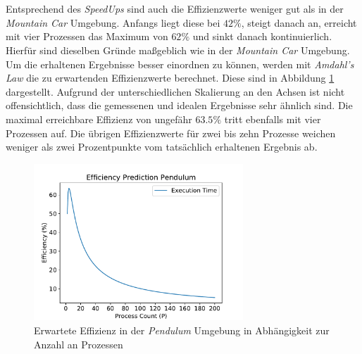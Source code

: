\\\\
Entsprechend des \emph{SpeedUps} sind auch die Effizienzwerte weniger gut als in der \emph{Mountain Car} Umgebung. Anfangs liegt diese bei $42\%$, steigt danach an, erreicht mit vier Prozessen das Maximum von $62\%$ und sinkt danach kontinuierlich. Hierfür sind dieselben Gründe maßgeblich wie in der \emph{Mountain Car} Umgebung. Um die erhaltenen Ergebnisse besser einordnen zu können, werden mit \emph{Amdahl's Law} die zu erwartenden Effizienzwerte berechnet. Diese sind in Abbildung \ref{fig:pendulumr_efficiency_predidction} dargestellt. Aufgrund der unterschiedlichen Skalierung an den Achsen ist nicht offensichtlich, dass die gemessenen und idealen Ergebnisse sehr ähnlich sind. Die maximal erreichbare Effizienz von ungefähr $63.5\%$ tritt ebenfalls mit vier Prozessen auf. Die übrigen Effizienzwerte für zwei bis zehn Prozesse weichen weniger als zwei Prozentpunkte vom tatsächlich erhaltenen Ergebnis ab. 
\begin{figure}[!h]
	\centering
	\includegraphics[width=0.7\textwidth]{./img/pendulum_analysis/pendulum_efficiency_prediction.pdf} 
	\caption{Erwartete Effizienz in der \emph{Pendulum} Umgebung in Abhängigkeit zur Anzahl an Prozessen}
	\label{fig:pendulumr_efficiency_predidction}
\end{figure}

